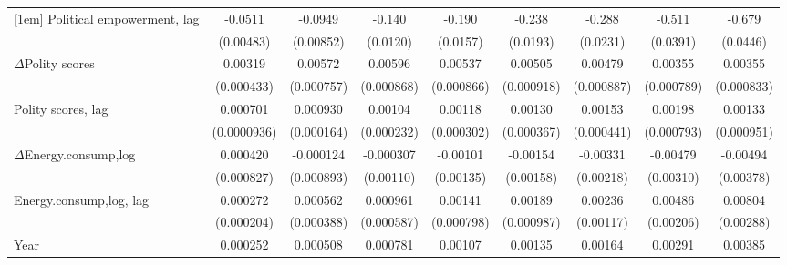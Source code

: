 \begin{table}[htbp]
\begin{tabular}{l*{8}{c}}
[1em]
Political empowerment, lag  &     -0.0511\sym{***}&     -0.0949\sym{***}&      -0.140\sym{***}&      -0.190\sym{***}&      -0.238\sym{***}&      -0.288\sym{***}&      -0.511\sym{***}&      -0.679\sym{***}\\
                    &   (0.00483)         &   (0.00852)         &    (0.0120)         &    (0.0157)         &    (0.0193)         &    (0.0231)         &    (0.0391)         &    (0.0446)         \\
[1em]
$\Delta$Polity scores              &     0.00319\sym{***}&     0.00572\sym{***}&     0.00596\sym{***}&     0.00537\sym{***}&     0.00505\sym{***}&     0.00479\sym{***}&     0.00355\sym{***}&     0.00355\sym{***}\\
                    &  (0.000433)         &  (0.000757)         &  (0.000868)         &  (0.000866)         &  (0.000918)         &  (0.000887)         &  (0.000789)         &  (0.000833)         \\
[1em]
Polity scores, lag           &    0.000701\sym{***}&    0.000930\sym{***}&     0.00104\sym{***}&     0.00118\sym{***}&     0.00130\sym{***}&     0.00153\sym{***}&     0.00198\sym{**} &     0.00133         \\
                    & (0.0000936)         &  (0.000164)         &  (0.000232)         &  (0.000302)         &  (0.000367)         &  (0.000441)         &  (0.000793)         &  (0.000951)         \\
[1em]
$\Delta$Energy.consump,log              &    0.000420         &   -0.000124         &   -0.000307         &    -0.00101         &    -0.00154         &    -0.00331         &    -0.00479         &    -0.00494         \\
                    &  (0.000827)         &  (0.000893)         &   (0.00110)         &   (0.00135)         &   (0.00158)         &   (0.00218)         &   (0.00310)         &   (0.00378)         \\
[1em]
Energy.consump,log, lag            &    0.000272         &    0.000562         &    0.000961         &     0.00141\sym{*}  &     0.00189\sym{*}  &     0.00236\sym{**} &     0.00486\sym{**} &     0.00804\sym{***}\\
                    &  (0.000204)         &  (0.000388)         &  (0.000587)         &  (0.000798)         &  (0.000987)         &   (0.00117)         &   (0.00206)         &   (0.00288)         \\
[1em]
Year                &    0.000252\sym{***}&    0.000508\sym{***}&    0.000781\sym{***}&     0.00107\sym{***}&     0.00135\sym{***}&     0.00164\sym{***}&     0.00291\sym{***}&     0.00385\sym{***}\\

\end{tabular}
\end{table}
